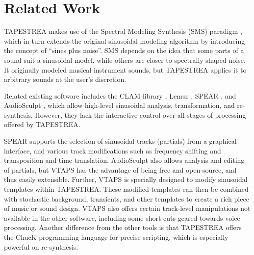 \documentclass{article}
\begin{document}
\section{Related Work}


TAPESTREA makes use of the Spectral Modeling Synthesis (SMS) paradigm \cite{sms}, which 
in turn extends the original sinusoidal modeling algorithm \cite{mq} by introducing 
the concept of ``sines plus noise''. SMS depends on the idea that some parts of a sound suit 
a sinusoidal model, while others are closer to spectrally shaped noise. It  
originally modeled musical instrument sounds, but TAPES\-TREA applies it to arbitrary sounds 
at the user's discretion. 

Related existing software includes the CLAM library \cite{clam}, Lemur \cite{lemur}, SPEAR \cite{spear}, and AudioSculpt \cite{audiosculpt}, which allow high-level sinusoidal analysis, transformation, and re-synthesis. However, they lack the interactive control over all stages of processing offered by  
TAPESTREA. 

SPEAR \cite{spear} supports the selection of sinusoidal tracks (partials) from a graphical interface,%
and various track modifications such as frequency shifting and transposition and time translation. AudioSculpt \cite{audiosculpt} also allows analysis and editing of partials, but VTAPS has the advantage of being free and open-source, and thus easily extensible.
Further, VTAPS is specially designed to modify sinusoidal templates within TAPESTREA. These modified templates 
can then be combined with sto\-chastic background, transients, and other templates 
to create a rich piece of music or sound design. VTAPS also offers certain track-level manipulations not available in the other software, including some short-cuts geared towards voice processing. 
Another difference from the other tools is that TAPESTREA offers 
the ChucK \cite{chuck} programming language for precise scripting, which is 
especially powerful on re-synthesis. 
\end{document}
